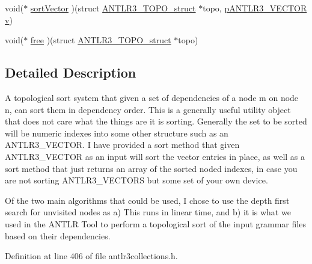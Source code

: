 \begin{DoxyCompactItemize}
\item 
void($\ast$ \hyperlink{struct_a_n_t_l_r3___t_o_p_o__struct_a2a4e96e0e13c17271e067977ea2b92f3}{sort\-Vector} )(struct \hyperlink{struct_a_n_t_l_r3___t_o_p_o__struct}{A\-N\-T\-L\-R3\-\_\-\-T\-O\-P\-O\-\_\-struct} $\ast$topo, \hyperlink{antlr3interfaces_8h_a0dfeeada7529fbe1b968be84079b828f}{p\-A\-N\-T\-L\-R3\-\_\-\-V\-E\-C\-T\-O\-R} \hyperlink{aberrations___t_e_m_8m_ac4055e3a20b6b3af3d10590ea446ef6c}{v})
\item 
void($\ast$ \hyperlink{struct_a_n_t_l_r3___t_o_p_o__struct_a6ff84907fd59bf0bb1eacbb6b6dbbd5e}{free} )(struct \hyperlink{struct_a_n_t_l_r3___t_o_p_o__struct}{A\-N\-T\-L\-R3\-\_\-\-T\-O\-P\-O\-\_\-struct} $\ast$topo)
\end{DoxyCompactItemize}


\subsection{Detailed Description}
A topological sort system that given a set of dependencies of a node m on node n, can sort them in dependency order. This is a generally useful utility object that does not care what the things are it is sorting. Generally the set to be sorted will be numeric indexes into some other structure such as an A\-N\-T\-L\-R3\-\_\-\-V\-E\-C\-T\-O\-R. I have provided a sort method that given A\-N\-T\-L\-R3\-\_\-\-V\-E\-C\-T\-O\-R as an input will sort the vector entries in place, as well as a sort method that just returns an array of the sorted noded indexes, in case you are not sorting A\-N\-T\-L\-R3\-\_\-\-V\-E\-C\-T\-O\-R\-S but some set of your own device.

Of the two main algorithms that could be used, I chose to use the depth first search for unvisited nodes as a) This runs in linear time, and b) it is what we used in the A\-N\-T\-L\-R Tool to perform a topological sort of the input grammar files based on their dependencies. 

Definition at line 406 of file antlr3collections.\-h.



